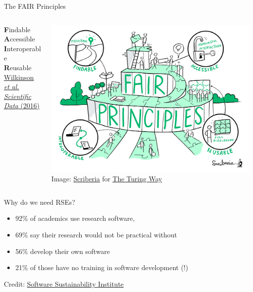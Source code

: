 \documentclass{beamer} %
\begin{document}
  \begin{frame}{The FAIR Principles}
    \begin{columns}
      \begin{column}{0.3\textwidth}
        \huge
        \textbf{F}indable\\
        \textbf{A}ccessible\\
        \textbf{I}nteroperable\\
        \textbf{R}eusable\\
        \vspace{1cm}
        \tiny
        \href{https://www.nature.com/articles/sdata201618}{Wilkinson \textit{et al. Scientific Data} (2016)}
      \end{column}
      
      \begin{column}{0.7\textwidth}
        \includegraphics[width=\textwidth]{fair-principles.jpg}
        \tiny
        Image: \href{http://www.scriberia.co.uk/}{\underline{Scriberia}} for \href{https://the-turing-way.netlify.app/}{\underline{The Turing Way}}
      \end{column}
      
    \end{columns}
  \end{frame}

  \begin{frame}{Why do we need RSEs?}
    \begin{itemize}
      \item 92\% of academics use research software,
      \item 69\% say their research would not be practical without 
      \item 56\% develop their own software
      \item 21\% of those have no training in software development (!)
    \end{itemize}
    \vspace{2cm}
    \tiny
    Credit: \href{https://www.software.ac.uk/}{Software Sustainability Institute}
  \end{frame}
\end{document}
